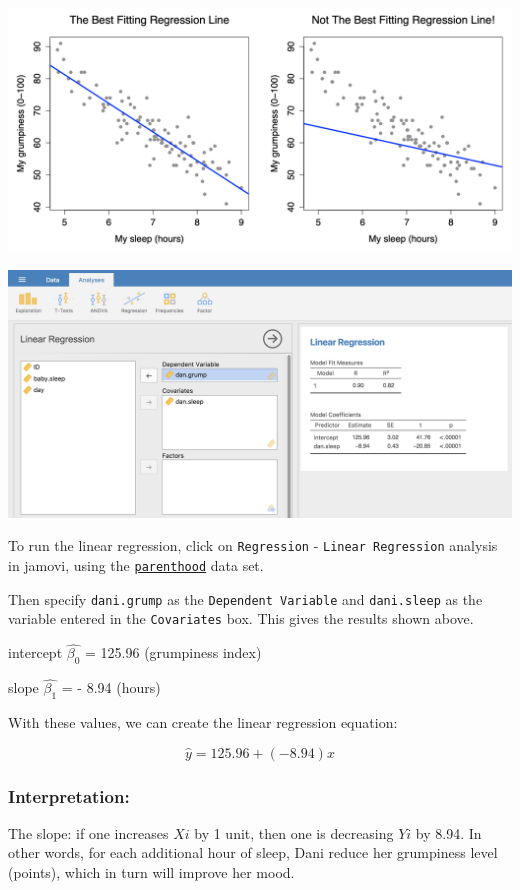 \documentclass[
]{article}
\begin{document}
\includegraphics{images/paste-DF1CA582.png}

\includegraphics{images/paste-D53FB07C.png}

To run the linear regression, click on \texttt{Regression} - \texttt{Linear\ Regression} analysis in jamovi, using the \href{https://lsj.readthedocs.io/en/latest/Ch12/_static/data/parenthood.omv}{\texttt{parenthood}} data set.

Then specify \texttt{dani.grump} as the \texttt{Dependent\ Variable} and \texttt{dani.sleep} as the variable entered in the \texttt{Covariates} box. This gives the results shown above.

intercept \(\hat{\beta_0}\) = 125.96 (grumpiness index)

slope \(\hat{\beta_1}\) = - 8.94 (hours)

With these values, we can create the linear regression equation:

\[
\hat{y} = 125.96 + (-8.94)x
\]

\hypertarget{interpretation-2}{%
\subsubsection{Interpretation:}\label{interpretation-2}}

The slope: if one increases \(Xi\) by 1 unit, then one is decreasing \(Yi\) by 8.94. In other words, for each additional hour of sleep, Dani reduce her grumpiness level (points), which in turn will improve her mood.
\end{document}
